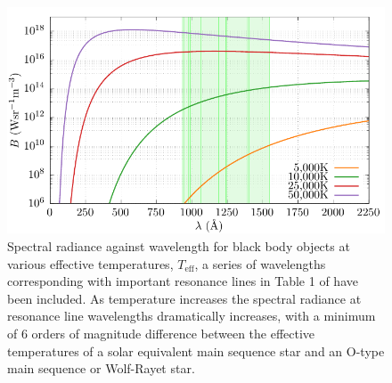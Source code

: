 \begin{figure}[h]
  \centering
  \includegraphics{assets/plancks-law/plancks-law.pdf}
  \caption[Planck's law radiance comparison with resonance lines]{Spectral radiance against wavelength for black body objects at various effective temperatures, $T_{\text{eff}}$, a series of wavelengths corresponding with important resonance lines in Table 1 of \textcite{lucy_mass_1970} have been included. As temperature increases the spectral radiance at resonance line wavelengths dramatically increases, with a minimum of 6 orders of magnitude difference between the effective temperatures of a solar equivalent main sequence star and an O-type main sequence or Wolf-Rayet star.}
  \label{fig:planck-comp}
\end{figure}


